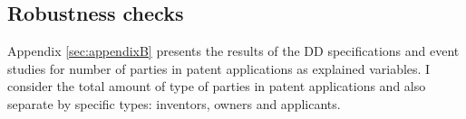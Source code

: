 \documentclass[../main.tex]{subfiles}
\begin{document}
\subsection{Robustness checks}

Appendix \ref{sec:appendixB} presents the results of the DD specifications and event studies for number of parties in patent applications as explained variables. I consider the total amount of type of parties in patent applications and also separate by specific types: inventors, owners and applicants. 
\end{document}
